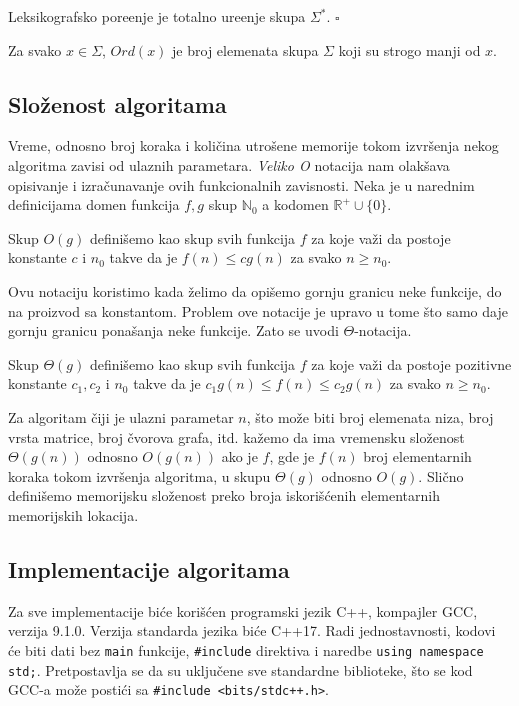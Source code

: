 \begin{thm}
Leksikografsko pore\dj enje je totalno ure\dj enje skupa $\Sigma^*$. \hfill $\square$
\end{thm}

\begin{dfn}
Za svako $x \in \Sigma$, $Ord(x)$ je broj elemenata skupa $\Sigma$ koji su strogo manji od $x$.
\end{dfn}
 
\subsection{Slo\v zenost algoritama}

Vreme, odnosno broj koraka i koli\v cina utro\v sene memorije tokom izvr\v senja nekog algoritma zavisi od ulaznih parametara. \textit{Veliko O} notacija nam olak\v sava opisivanje i izra\v cunavanje ovih funkcionalnih zavisnosti. Neka je u narednim definicijama domen funkcija $f, g$ skup $\mathbb{N}_0$ a kodomen $\mathbb{R}^{+} \cup \{ 0 \}$.

\begin{dfn}
Skup $O(g)$ defini\v semo kao skup svih funkcija $f$ za koje va\v zi da postoje konstante $c$ i $n_0$ takve da je $f(n) \leq c g(n)$ za svako $n \geq n_0$.
\end{dfn}

Ovu notaciju koristimo kada \v zelimo da opi\v semo gornju granicu neke funkcije, do na proizvod sa konstantom. Problem ove notacije je upravo u tome \v sto samo daje gornju granicu pona\v sanja neke funkcije. Zato se uvodi $\Theta$-notacija.

\begin{dfn}
Skup $\Theta(g)$ defini\v semo kao skup svih funkcija $f$ za koje va\v zi da postoje pozitivne konstante $c_1, c_2$ i $n_0$ takve da je $c_1 g(n) \leq f(n) \leq c_2 g(n)$ za svako $n \geq n_0$.
\end{dfn}

Za algoritam \v ciji je ulazni parametar $n$, \v sto mo\v ze biti broj elemenata niza, broj vrsta matrice, broj \v cvorova grafa, itd. ka\v zemo da ima vremensku slo\v zenost $\Theta(g(n))$ odnosno $O(g(n))$ ako je $f$, gde je $f(n)$ broj elementarnih koraka tokom izvr\v senja algoritma, u skupu $\Theta(g)$ odnosno $O(g)$. Sli\v cno defini\v semo memorijsku slo\v zenost preko broja iskori\v s\' cenih elementarnih memorijskih lokacija.

\subsection{Implementacije algoritama}

Za sve implementacije bi\' ce kori\v s\' cen programski jezik C++, kompajler GCC, verzija 9.1.0. Verzija standarda jezika bi\' ce C++17. Radi jednostavnosti, kodovi \' ce biti dati bez \texttt{main} funkcije, \texttt{\#include} direktiva i naredbe \texttt{using namespace std;}. Pretpostavlja se da su uklju\v cene sve standardne biblioteke, \v sto se kod GCC-a mo\v ze posti\' ci sa \texttt{\#include <bits/stdc++.h>}.